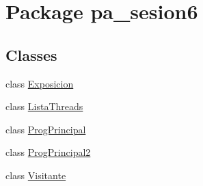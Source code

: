 \hypertarget{namespacepa__sesion6}{}\section{Package pa\+\_\+sesion6}
\label{namespacepa__sesion6}
\subsection*{Classes}
\begin{DoxyCompactItemize}
\item 
class \mbox{\hyperlink{classpa__sesion6_1_1_exposicion}{Exposicion}}
\item 
class \mbox{\hyperlink{classpa__sesion6_1_1_lista_threads}{Lista\+Threads}}
\item 
class \mbox{\hyperlink{classpa__sesion6_1_1_prog_principal}{Prog\+Principal}}
\item 
class \mbox{\hyperlink{classpa__sesion6_1_1_prog_principal2}{Prog\+Principal2}}
\item 
class \mbox{\hyperlink{classpa__sesion6_1_1_visitante}{Visitante}}
\end{DoxyCompactItemize}

